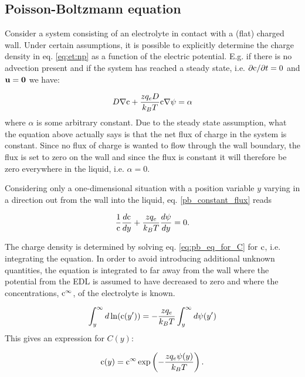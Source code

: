 \subsection{Poisson-Boltzmann equation}\label{sec:et:pb}
Consider a system consisting of an electrolyte in contact with a
(flat) charged wall.  Under certain assumptions, it is possible to
explicitly determine the charge density in eq. \eqref{eq:et:np} as a
function of the electric potential. E.g. if there is no advection
present and if the system has reached a steady state, i.e. $\partial
\mathrm{c} /\partial t = 0$ and $\mathbf{u} = \mathbf{0}$ we have:

\begin{equation}\label{pb_constant_flux}
D\nabla \mathrm{c} + \frac{zq_eD}{k_BT}\mathrm{c}\nabla\mathrm{\psi} = \alpha
\end{equation} 
where $\alpha$ is some arbitrary constant. Due to the steady state
assumption, what the equation above actually says is that the net flux
of charge in the system is constant. Since no flux of charge is wanted
to flow through the wall boundary, the flux is set to zero on the wall
and since the flux is constant it will therefore be zero everywhere in
the liquid, i.e. $\alpha = 0$.

Considering only a one-dimensional situation with a position variable
$y$ varying in a direction out from the wall into the liquid,
eq. \eqref{pb_constant_flux} reads

\begin{equation}\label{eq:pb_eq_for_C}
\frac{1}{\mathrm{c}} \dfrac{d \mathrm{c}}{d y} + \frac{zq_e}{k_BT} \dfrac{d \mathrm{\psi}}{d
  y} = 0.
\end{equation}

The charge density is determined by solving eq. \eqref{eq:pb_eq_for_C}
for $\mathrm{c}$, i.e. integrating the equation. In order to avoid introducing
additional unknown quantities, the equation is integrated to far away
from the wall where the potential from the EDL is assumed to have
decreased to zero and where the concentrations, $\mathrm{c}^{\infty}$, of the
electrolyte is known.

\begin{equation}
\int_y^{\infty} d\ln( \mathrm{c}(y')) = -\frac{z q_e}{k_BT}\int_y^{\infty}d\mathrm{\psi}(y')
\end{equation}
This gives an expression for $C(y)$:

\begin{equation}\label{eq:C}
\mathrm{c}(y) = \mathrm{c}^{\infty} \exp\left(-\frac{z q_e \mathrm{\psi}(y)}{k_BT}\right).
\end{equation}

